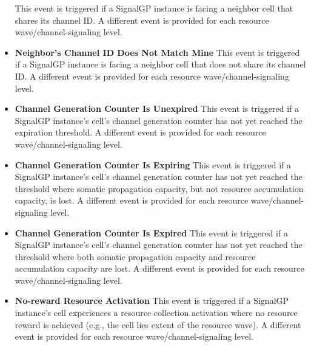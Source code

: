 \begin{itemize}
This event is triggered if a SignalGP instance is facing a neighbor cell that shares its channel ID.
A different event is provided for each resource wave/channel-signaling level.
\item \textbf{Neighbor's Channel ID Does Not Match Mine}
This event is triggered if a SignalGP instance is facing a neighbor cell that does not share its channel ID.
A different event is provided for each resource wave/channel-signaling level.
\item \textbf{Channel Generation Counter Is Unexpired}
This event is triggered if a SignalGP instance's cell's channel generation counter has not yet reached the expiration threshold.
A different event is provided for each resource wave/channel-signaling level.
\item \textbf{Channel Generation Counter Is Expiring}
This event is triggered if a SignalGP instance's cell's channel generation counter has not yet reached the threshold where somatic propagation capacity, but not resource accumulation capacity, is lost.
A different event is provided for each resource wave/channel-signaling level.
\item \textbf{Channel Generation Counter Is Expired}
This event is triggered if a SignalGP instance's cell's channel generation counter has not yet reached the threshold where both somatic propagation capacity and resource accumulation capacity are lost.
A different event is provided for each resource wave/channel-signaling level.
\item \textbf{No-reward Resource Activation}
This event is triggered if a SignalGP instance's cell experiences a resource collection activation where no resource reward is achieved (e.g., the cell lies extent of the resource wave).
A different event is provided for each resource wave/channel-signaling level.
\end{itemize}


